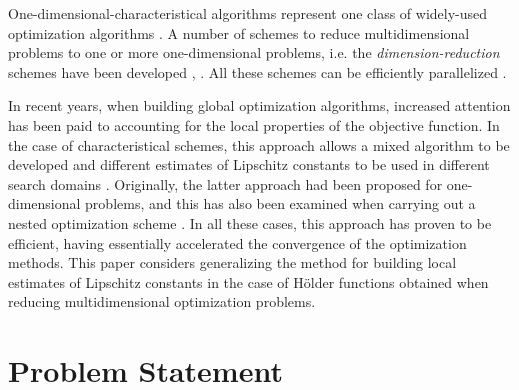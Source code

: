 \documentclass[procedia]{easychair}
\begin{document}
One-dimensional-characteristical algorithms represent one class of widely-used
optimization algorithms \cite{optHandbook}. A number of schemes to reduce multidimensional problems
to one or more one-dimensional problems, i.e. the \textit{dimension-reduction} schemes
have been developed \cite{evolvents2013}, \cite{gergelGrishaginStringin2013}.
All these schemes can be efficiently parallelized \cite{optParallelBook}.
\par
In recent years, when building global optimization algorithms, increased attention
has been paid to accounting for the local properties of the objective function.
In the case of characteristical schemes, this approach allows a mixed algorithm
to be developed \cite{mixedAlg} and different estimates of Lipschitz constants to
be used in different search domains \cite{sergLocalTuningFirst}. Originally, the
latter approach had been proposed for one-dimensional problems, and this has also
been examined when carrying out a nested optimization scheme \cite{nestedLocal}.
In all these cases, this approach has proven to be efficient, having essentially
accelerated the convergence of the optimization methods. This paper considers generalizing
the method for building local estimates of Lipschitz constants in the case of Hölder
functions obtained when reducing multidimensional optimization problems.

\section{Problem Statement}
\label{sect:problem}
\end{document}
